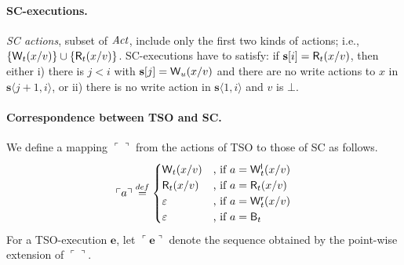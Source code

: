 \paragraph{SC-executions.}
{\em SC actions}, subset of $\mathit{Act}$, include only the first two kinds of actions; i.e., $\{\mathsf{W}_{t}(x/v)\}\cup\{\mathsf{R}_{t}(x/v)\}$.
SC-executions have to satisfy: if $\mathbf{s}[i]=\mathsf{R}_{t}(x/v)$, then either i) there is $j<i$ with $\mathbf{s}[j]=\mathsf{W}_{u}(x/v)$ and there are no write actions to $x$ in $\mathbf{s}\langle j+1,i\rangle$, or ii) there is no write action in $\mathbf{s}\langle 1,i\rangle$ and $v$ is $\bot$.



\newcommand{\SCofTSO}{\ensuremath{\mathsf{SC}}}
\newcommand{\SCofTSOx}[1]{\ensuremath{\SCofTSO(#1)}}
\newcommand{\SCofTSOstrict}{\ensuremath{\SCofTSO_S}}
\newcommand{\SCofTSOstrictx}[1]{\ensuremath{\SCofTSOstrict(#1)}}
\newcommand{\aliconvert}{\ensuremath{\ulcorner \urcorner}}
\newcommand{\aliconvertx}[1]{\ensuremath{\ulcorner #1 \urcorner}}
\newcommand{\tsoequiv}{\ensuremath{\approx}}
\newcommand{\tsoequivstrict}{\ensuremath{\tsoequiv_S}}
\newcommand{\equivclassx}[2]{\ensuremath{[#1]_{#2}}}
\newcommand{\tighter}{\ensuremath{\sqsubseteq}}
\newcommand{\tighterstrict}{\ensuremath{\tighter_S}}
\newcommand{\tightclosure}{\ensuremath{\mathsf{T}}}
\newcommand{\tightclosurex}[1]{\ensuremath{\tightclosure(#1)}}
\newcommand{\tightclosurestrict}{\ensuremath{\tightclosure_S}}
\newcommand{\tightclosurestrictx}[1]{\ensuremath{\tightclosurestrict(#1)}}

\paragraph{Correspondence between TSO and SC.}
We define a mapping $\aliconvert$ from the actions of TSO to those of SC as follows.
\[
\aliconvertx a \stackrel{def}{=} 
 \begin{cases}
  \aliwritex t x v & \text{, if } a=\locwritex t x v\\
  \alireadx t x v & \text{, if } a=\alireadx t x v\\
  \varepsilon & \text{, if } a=\remwritex t x v\\
  \varepsilon & \text{, if } a=\alibarrierx t
 \end{cases}
\]
For a TSO-execution $\mathbf{e}$, let $\aliconvertx {\mathbf{e}}$ denote the sequence obtained by the point-wise extension of $\aliconvert$.

